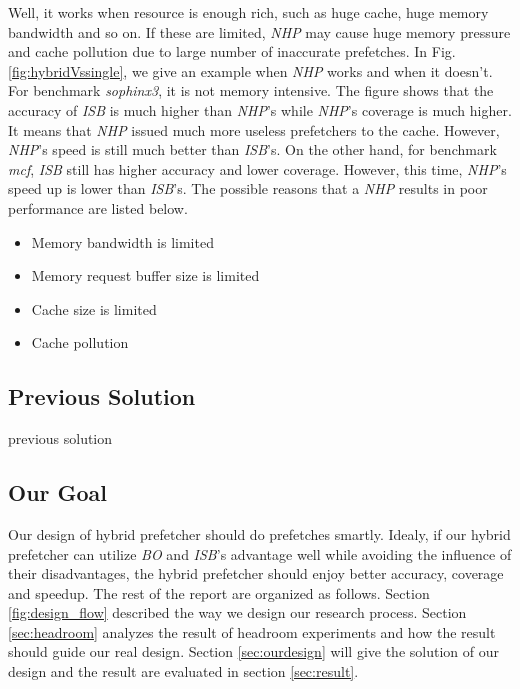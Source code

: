   Well, it works when resource is enough rich, such as huge cache, huge memory bandwidth and so on. If these are limited, \emph{NHP} may cause huge memory pressure and cache pollution due to large number of inaccurate prefetches. In Fig.\ref{fig:hybridVssingle}, we give an example when \emph{NHP} works and when it doesn't. For benchmark \emph{sophinx3}, it is not memory intensive. The figure shows that the accuracy of \emph{ISB} is much higher than \emph{NHP}'s while \emph{NHP}'s coverage is much higher. It means that \emph{NHP} issued much more useless prefetchers to the cache. However, \emph{NHP}'s speed is still much better than \emph{ISB}'s. On the other hand, for benchmark \emph{mcf}, \emph{ISB} still has higher accuracy and lower coverage. However, this time, \emph{NHP}'s speed up is lower than \emph{ISB}'s. The possible reasons that a \emph{NHP} results in poor performance are listed below.

  \begin{itemize}
    \item Memory bandwidth is limited
    \item Memory request buffer size is limited
    \item Cache size is limited
    \item Cache pollution
  \end{itemize}

  \subsection{Previous Solution}
  \label{sec:PrevSol}
  previous solution

\subsection{Our Goal}
  \label{sec:goal}
  Our design of hybrid prefetcher should do prefetches smartly. Idealy, if our hybrid prefetcher can utilize \emph{BO} and \emph{ISB}'s advantage well while avoiding the influence of their disadvantages, the hybrid prefetcher should enjoy better accuracy, coverage and speedup. The rest of the report are organized as follows. Section \ref{fig:design_flow} described the way we design our research process. Section \ref{sec:headroom} analyzes the result of headroom experiments and how the result should guide our real design. Section \ref{sec:ourdesign} will give the solution of our design and the result are evaluated in section \ref{sec:result}.
